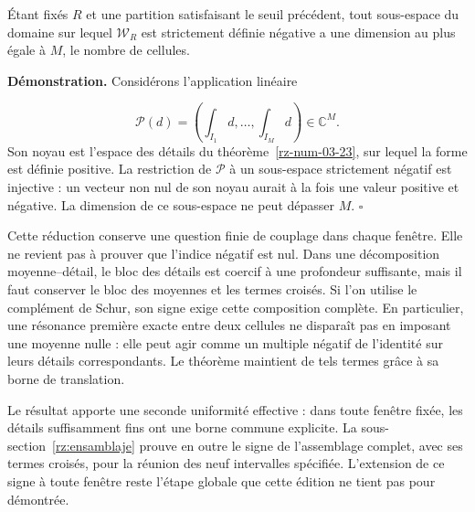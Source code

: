 Étant fixés \(R\) et une partition satisfaisant le seuil précédent, tout sous-espace du domaine sur lequel \(\mathscr W_R\) est strictement définie négative a une dimension au plus égale à \(M\), le nombre de cellules.

\textbf{Démonstration.} Considérons l'application linéaire

\[
\mathcal P(d)=\left(\int_{I_1}d,\ldots,
\int_{I_M}d\right)\in\mathbb C^M.
\]
Son noyau est l'espace des détails du théorème~\ref{rz-num-03-23}, sur lequel la forme est définie positive. La restriction de \(\mathcal P\) à un sous-espace strictement négatif est injective : un vecteur non nul de son noyau aurait à la fois une valeur positive et négative. La dimension de ce sous-espace ne peut dépasser \(M\). \hfill\(\square\)

Cette réduction conserve une question finie de couplage dans chaque fenêtre. Elle ne revient pas à prouver que l’indice négatif est nul. Dans une décomposition moyenne–détail, le bloc des détails est coercif à une profondeur suffisante, mais il faut conserver le bloc des moyennes et les termes croisés. Si l’on utilise le complément de Schur, son signe exige cette composition complète. En particulier, une résonance première exacte entre deux cellules ne disparaît pas en imposant une moyenne nulle : elle peut agir comme un multiple négatif de l’identité sur leurs détails correspondants. Le théorème maintient de tels termes grâce à sa borne de translation.

Le résultat apporte une seconde uniformité effective : dans toute fenêtre fixée, les détails suffisamment fins ont une borne commune explicite. La sous-section~\ref{rz:ensamblaje} prouve en outre le signe de l'assemblage complet, avec ses termes croisés, pour la réunion des neuf intervalles spécifiée. L'extension de ce signe à toute fenêtre reste l'étape globale que cette édition ne tient pas pour démontrée.
